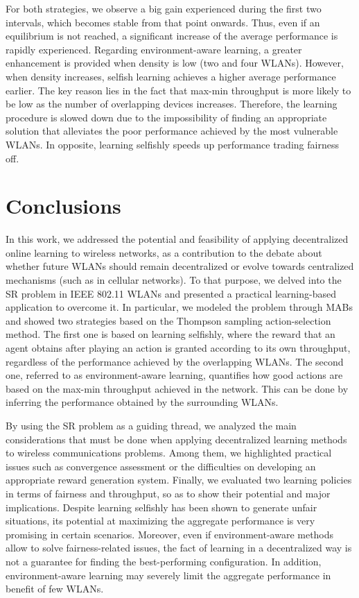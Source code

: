 \documentclass{article}
\begin{document}
For both strategies, we observe a big gain experienced during the first two intervals, which becomes stable from that point onwards. Thus, even if an equilibrium is not reached, a significant increase of the average performance is rapidly experienced. Regarding environment-aware learning, a greater enhancement is provided when density is low (two and four WLANs). However, when density increases, selfish learning achieves a higher average performance earlier. The key reason lies in the fact that max-min throughput is more likely to be low as the number of overlapping devices increases. Therefore, the learning procedure is slowed down due to the impossibility of finding an appropriate solution that alleviates the poor performance achieved by the most vulnerable WLANs. In opposite, learning selfishly speeds up performance trading fairness off.

\section{Conclusions}
\label{section:conclusions}		
In this work, we addressed the potential and feasibility of applying decentralized online learning to wireless networks, as a contribution to the debate about whether future WLANs should remain decentralized or evolve towards centralized mechanisms (such as in cellular networks). To that purpose, we delved into the SR problem in IEEE 802.11 WLANs and presented a practical learning-based application to overcome it. In particular, we modeled the problem through MABs and showed two strategies based on the Thompson sampling action-selection method. The first one is based on learning selfishly, where the reward that an agent obtains after playing an action is granted according to its own throughput, regardless of the performance achieved by the overlapping WLANs. The second one, referred to as environment-aware learning, quantifies how good actions are based on the max-min throughput achieved in the network. This can be done by inferring the performance obtained by the surrounding WLANs. 

By using the SR problem as a guiding thread, we analyzed the main considerations that must be done when applying decentralized learning methods to wireless communications problems. Among them, we highlighted practical issues such as convergence assessment or the difficulties on developing an appropriate reward generation system. Finally, we evaluated two learning policies in terms of fairness and throughput, so as to show their potential and major implications. Despite learning selfishly has been shown to generate unfair situations, its potential at maximizing the aggregate performance is very promising in certain scenarios. Moreover, even if environment-aware methods allow to solve fairness-related issues, the fact of learning in a decentralized way is not a guarantee for finding the best-performing configuration. In addition, environment-aware learning may severely limit the aggregate performance in benefit of few WLANs. 
\end{document}
